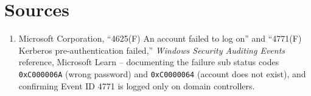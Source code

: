\section*{Sources}
\begin{enumerate}[label=\lbrack\arabic*\rbrack, leftmargin=2.2em]
\item {}Microsoft Corporation, ``4625(F) An account failed to log on'' and
``4771(F) Kerberos pre-authentication failed,'' \emph{Windows Security Auditing Events} reference,
Microsoft Learn -- documenting the failure sub status codes \texttt{0xC000006A} (wrong password) and
\texttt{0xC0000064} (account does not exist), and confirming Event ID 4771 is logged only on domain
controllers.
\end{enumerate}
